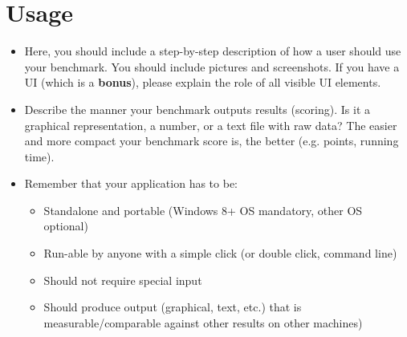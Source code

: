 \chapter{Usage}

\begin{itemize}
  \item Here, you should include a step-by-step description of how a user should use your benchmark. You should include pictures and screenshots. If you have a UI (which is a \textbf{bonus}), please explain the role of all visible UI elements.
  
  \item Describe the manner your benchmark outputs results (scoring). Is it a graphical representation, a number, or a text file with raw data? The easier and more compact your benchmark score is, the better (e.g. points, running time).
  
  \item Remember that your application has to be: 
    \begin{itemize}
    \item Standalone and portable (Windows 8+ OS mandatory, other OS optional)
    \item Run-able by anyone with a simple click (or double click, command line)
    \item Should not require special input
    \item Should produce output (graphical, text, etc.) that is measurable/comparable against other results on other machines)
    \end{itemize}
\end{itemize}



